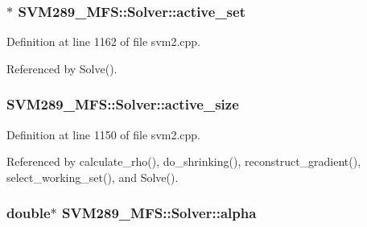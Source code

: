 \subsubsection[{\texorpdfstring{active\+\_\+set}{active_set}}]{$\ast$ S\+V\+M289\+\_\+\+M\+F\+S\+::\+Solver\+::active\+\_\+set\hspace{0.3cm}{\ttfamily [protected]}}\hypertarget{class_s_v_m289___m_f_s_1_1_solver_a7b9a480a3eaae0248a03ebf399dd3c75}{}\label{class_s_v_m289___m_f_s_1_1_solver_a7b9a480a3eaae0248a03ebf399dd3c75}


Definition at line 1162 of file svm2.\+cpp.



Referenced by Solve().

\subsubsection[{\texorpdfstring{active\+\_\+size}{active_size}}]{ S\+V\+M289\+\_\+\+M\+F\+S\+::\+Solver\+::active\+\_\+size\hspace{0.3cm}{\ttfamily [protected]}}\hypertarget{class_s_v_m289___m_f_s_1_1_solver_a8996bbbda51e87b157af0e8c4ad78411}{}\label{class_s_v_m289___m_f_s_1_1_solver_a8996bbbda51e87b157af0e8c4ad78411}


Definition at line 1150 of file svm2.\+cpp.



Referenced by calculate\+\_\+rho(), do\+\_\+shrinking(), reconstruct\+\_\+gradient(), select\+\_\+working\+\_\+set(), and Solve().

\subsubsection[{\texorpdfstring{alpha}{alpha}}]{\setlength{\rightskip}{0pt plus 5cm}double$\ast$ S\+V\+M289\+\_\+\+M\+F\+S\+::\+Solver\+::alpha\hspace{0.3cm}{\ttfamily [protected]}}\hypertarget{class_s_v_m289___m_f_s_1_1_solver_a5a6158adccc034c04bdacf91e6bbb237}{}\label{class_s_v_m289___m_f_s_1_1_solver_a5a6158adccc034c04bdacf91e6bbb237}


